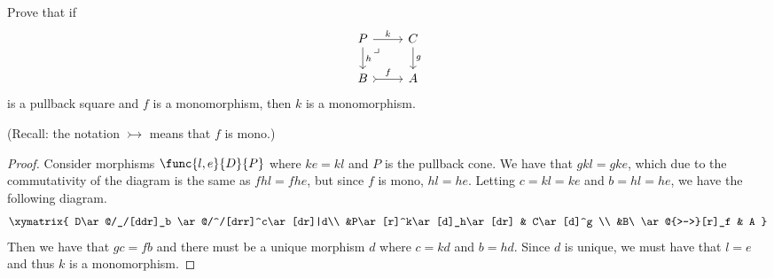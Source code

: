 \documentclass[../../main]{subfiles}
\begin{document}
\paragraph{}
\begin{exercise}
	Prove that if
	\[\begin{tikzcd}
			P \ar[r, "k"] \ar[d, "h"]
			\ar[dr, phantom, "\lrcorner", very near start] & C\ar[d, "g"] \\
			B \ar[r, rightarrowtail, "f"] & A
	\end{tikzcd}\]
	is a pullback square and $f$ is a monomorphism, then $k$ is a monomorphism.
\end{exercise}
(Recall: the notation $\rightarrowtail$ means that $f$ is mono.)
\begin{proof}
	Consider morphisms $\func{l,e}{D}{P}$ where $ke=kl$ and $P$ is the pullback
	cone. We have that $gkl = gke$, which due to the commutativity of the diagram
	is the same as $fhl = fhe$, but since $f$ is mono, $hl=he$. Letting
	$c=kl=ke$ and $b=hl=he$, we have the following diagram.
	\[\xymatrix{
		D\ar@/_/[ddr]_b \ar@/^/[drr]^c\ar[dr]|d\\
		&P\ar[r]^k\ar[d]_h\ar[dr] & C\ar[d]^g \\
		&B\ \ar@{>->}[r]_f & A
	}\]
	Then we have that $gc=fb$ and there must be a unique morphism $d$ where
	$c=kd$ and $b=hd$. Since $d$ is unique, we must have that $l=e$ and thus $k$
	is a monomorphism.
\end{proof}
\end{document}
